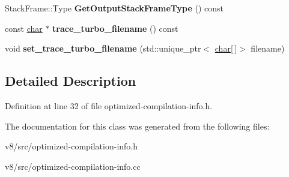 \begin{DoxyCompactItemize}
\item 
\mbox{\label{classv8_1_1internal_1_1OptimizedCompilationInfo_a2482536709d37877bd079e28a72aab35}} 
Stack\+Frame\+::\+Type {\bfseries Get\+Output\+Stack\+Frame\+Type} () const
\item 
\mbox{\label{classv8_1_1internal_1_1OptimizedCompilationInfo_aa57d8b59188739fe17aadfea43fd4052}} 
const \mbox{\hyperlink{classchar}{char}} $\ast$ {\bfseries trace\+\_\+turbo\+\_\+filename} () const
\item 
\mbox{\label{classv8_1_1internal_1_1OptimizedCompilationInfo_a05c578eb87f54190316565c17dc54b27}} 
void {\bfseries set\+\_\+trace\+\_\+turbo\+\_\+filename} (std\+::unique\+\_\+ptr$<$ \mbox{\hyperlink{classchar}{char}}\mbox{[}$\,$\mbox{]}$>$ filename)
\end{DoxyCompactItemize}


\subsection{Detailed Description}


Definition at line 32 of file optimized-\/compilation-\/info.\+h.



The documentation for this class was generated from the following files\+:\begin{DoxyCompactItemize}
\item 
v8/src/optimized-\/compilation-\/info.\+h\item 
v8/src/optimized-\/compilation-\/info.\+cc\end{DoxyCompactItemize}
